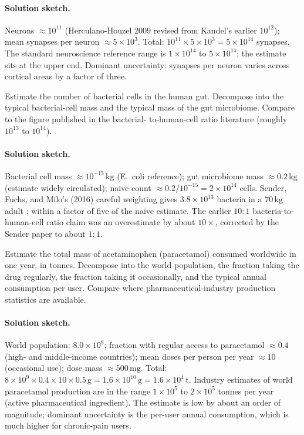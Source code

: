 \paragraph{Solution sketch.}
Neurons $\approx 10^{11}$ (Herculano-Houzel 2009 revised from
Kandel's earlier $10^{12}$); mean synapses per neuron $\approx 5
\times 10^{3}$. Total: $10^{11} \times 5 \times 10^{3} = 5 \times
10^{14}$ synapses. The standard neuroscience reference range is
$1 \times 10^{14}$ to $5 \times 10^{14}$; the estimate sits at
the upper end. Dominant uncertainty: synapses per neuron varies
across cortical areas by a factor of three.

\begin{exercise}
Estimate the number of bacterial cells in the human gut. Decompose
into the typical bacterial-cell mass and the typical mass of the
gut microbiome. Compare to the figure published in the bacterial-
to-human-cell ratio literature (roughly $10^{13}$ to $10^{14}$).
\end{exercise}

\paragraph{Solution sketch.}
Bacterial cell mass $\approx 10^{-15} \,\si{\kilo\gram}$ (E.\ coli
reference); gut microbiome mass $\approx 0.2 \,\si{\kilo\gram}$
(estimate widely circulated); naive count $\approx 0.2 / 10^{-15}
= 2 \times 10^{14}$ cells. Sender, Fuchs, and Milo's (2016)
careful weighting gives $3.8 \times 10^{13}$ bacteria in a
$70 \,\si{\kilo\gram}$ adult \cite{paper:ch09-sender-cells-2016};
within a factor of five of the naive estimate. The earlier $10:1$
bacteria-to-human-cell ratio claim was an overestimate by about
$10\times$, corrected by the Sender paper to about $1:1$.

\begin{exercise}
Estimate the total mass of acetaminophen (paracetamol) consumed
worldwide in one year, in tonnes. Decompose into the world
population, the fraction taking the drug regularly, the fraction
taking it occasionally, and the typical annual consumption per user.
Compare where pharmaceutical-industry production statistics are
available.
\end{exercise}

\paragraph{Solution sketch.}
World population: $8.0 \times 10^{9}$; fraction with regular access
to paracetamol $\approx 0.4$ (high- and middle-income countries);
mean doses per person per year $\approx 10$ (occasional use); dose
mass $\approx 500 \,\si{\milli\gram}$. Total: $8 \times 10^{9}
\times 0.4 \times 10 \times 0.5 \,\si{\gram} = 1.6 \times 10^{10}
\,\si{\gram} = 1.6 \times 10^{4} \,\si{\tonne}$. Industry estimates
of world paracetamol production are in the range $1 \times 10^{5}$
to $2 \times 10^{5}$ tonnes per year (active pharmaceutical
ingredient). The estimate is low by about an order of magnitude;
dominant uncertainty is the per-user annual consumption, which is
much higher for chronic-pain users.


